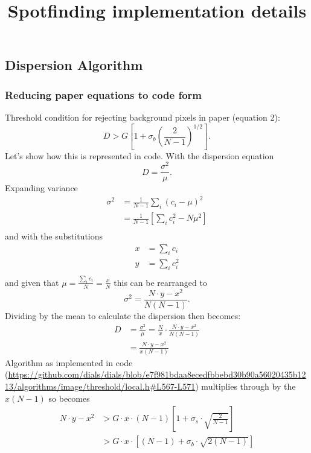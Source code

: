 \documentclass[10pt]{article}
\begin{document}
\title{Spotfinding implementation details}
\maketitle
\subsection*{Dispersion Algorithm}
\subsubsection*{Reducing paper equations to code form}
Threshold condition for rejecting background pixels in paper (equation 2):
\begin{equation}
    D > G \left[1 + \sigma_b\left(\frac{2}{N-1}\right)^{1/2}\right].
\end{equation}
Let's show how this is represented in code. With the dispersion equation
\begin{equation}
    D = \frac{\sigma^2}{\mu}.
\end{equation}
Expanding variance
\begin{align}
    \sigma^2 &= \frac{1}{N-1}\sum_i\left(c_i-\mu\right)^2 \\
    &= \frac{1}{N-1}\left[\sum_i c_i^2 - N\mu^2\right] \\
\end{align}
and with the substitutions
\begin{align}
    x & = \sum_i c_i \\
    y & = \sum_i c_i^2 \\
\end{align}
and given that $\mu = \frac{\sum_i c_i}{N} = \frac{x}{N}$ this can be rearranged to
\begin{equation}
    \sigma^2 = \frac{N\cdot y - x^2 }{N(N-1)}.
\end{equation}
Dividing by the mean to calculate the dispersion then becomes:
\begin{align}
    D &= \frac{\sigma^2}{\mu} = \frac{N}{x} \cdot \frac{N\cdot y - x^2}{N(N-1)} \\
      &= \frac{N\cdot y - x^2}{x(N-1)}
\end{align}
Algorithm as implemented in code (\url{https://github.com/dials/dials/blob/e7f981bdaa8ecedfbbebd30b90a56020435b1213/algorithms/image/threshold/local.h#L567-L571})
multiplies through by the $x(N-1)$ so becomes
\begin{align}
    N \cdot y - x^2 &> G \cdot x \cdot (N-1) \left[1 + \sigma_s\cdot\sqrt{\frac{2}{N-1}}\right] \\
    &> G \cdot x \cdot \left[(N - 1) + \sigma_b\cdot\sqrt{2(N-1)}\right]
\end{align}
\end{document}
